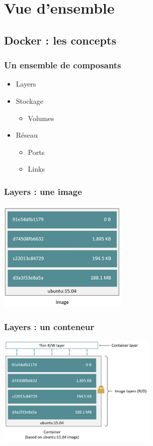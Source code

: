   \section[Docker]{Vue d'ensemble}

  \subsection[Docker]{Docker : les concepts}

  \begin{frame}
    \frametitle{Un ensemble de composants}
    \begin{itemize}
      \item Layers
      \item Stockage
      \begin{itemize}
          \item Volumes \pause
      \end{itemize}
      \item Réseau
      \begin{itemize}
          \item Ports \pause
          \item Links \pause
      \end{itemize}
    \end{itemize}
  \end{frame}

  \begin{frame}
    \frametitle{Layers : une image}
    \includegraphics[height=200px]{images/docker/image-layers.jpg}
  \end{frame}

  \begin{frame}
    \frametitle{Layers : un conteneur}
    \includegraphics[height=200px]{images/docker/container-layers.jpg}
  \end{frame}

